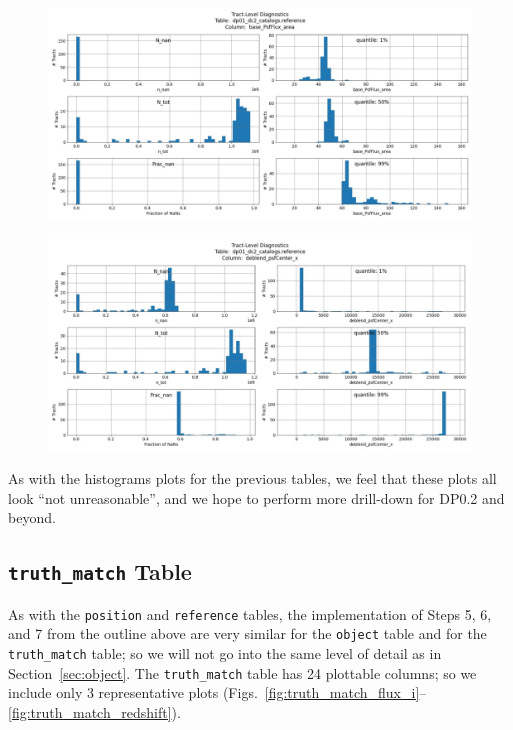 \documentclass[DM,authoryear,toc]{lsstdoc}
\begin{document}
\begin{figure}[h]
\centering
\includegraphics[width=1.0\linewidth]{Plots/reference_base_PsfFlux_area.pdf}
\caption{}
\label{fig:reference_base_psfflux_area}
\end{figure}

\begin{figure}[h]
\centering
\includegraphics[width=1.0\linewidth]{Plots/reference_deblend_psfCenter_x.pdf}
\caption{}
\label{fig:reference_deblend_psfcenter_x}
\end{figure}

As with the histograms plots for the previous tables, we feel that
these plots all look ``not unreasonable'', and we hope to perform more
drill-down for DP0.2 and beyond.


\subsection{\texttt{truth\_match} Table} \label{sec:truth_match}

As with the \texttt{position} and \texttt{reference} tables, the
implementation of Steps 5, 6, and 7 from the outline above are very
similar for the \texttt{object} table and for the \texttt{truth\_match}
table; so we will not go into the same level of detail as in
Section~\ref{sec:object}.  The \texttt{truth\_match} table has 24
plottable columns; so we include only 3 representative plots
(Figs.~\ref{fig:truth_match_flux_i}--\ref{fig:truth_match_redshift}).
\end{document}
